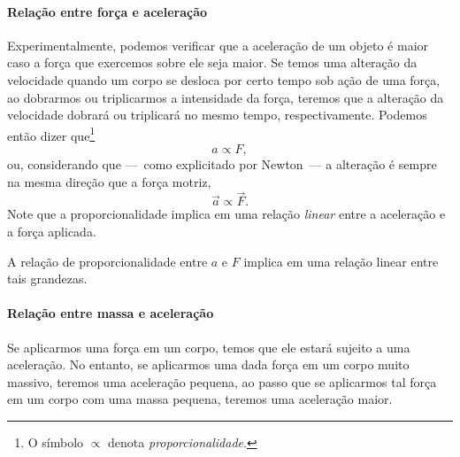 \paragraph{Relação entre força e aceleração}

Experimentalmente, podemos verificar que a aceleração de um objeto é maior caso a força que exercemos sobre ele seja maior. Se temos uma alteração da velocidade quando um corpo se desloca por certo tempo sob ação de uma força, ao dobrarmos ou triplicarmos a intensidade da força, teremos que a alteração da velocidade dobrará ou triplicará no mesmo tempo, respectivamente. Podemos então dizer que\footnote{O símbolo $\propto$ denota \emph{proporcionalidade}.}
\begin{equation}
  a \propto F,
\end{equation}
%
ou, considerando que ---~como explicitado por Newton~--- a alteração é sempre na mesma direção que a força motriz,
\begin{equation}
    \vec{a} \propto \vec{F}.
\end{equation}
%
Note que a proporcionalidade implica em uma relação \emph{linear} entre a aceleração e a força aplicada.

\begin{marginfigure}[1cm]
\centering
{}
\caption{A relação de proporcionalidade entre $a$ e $F$ implica em uma relação linear entre tais grandezas.}
\end{marginfigure}

\paragraph{Relação entre massa e aceleração}

Se aplicarmos uma força em um corpo, temos que ele estará sujeito a uma aceleração. No entanto, se aplicarmos uma dada força em um corpo muito massivo, teremos uma aceleração pequena, ao passo que se aplicarmos tal força em um corpo com uma massa pequena, teremos uma aceleração maior.

